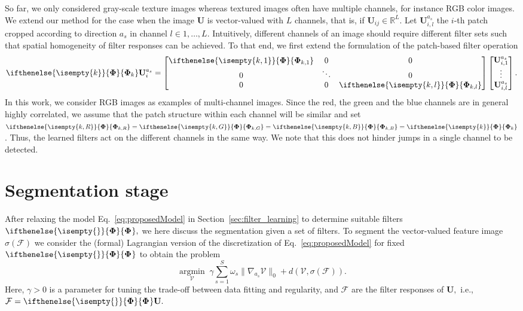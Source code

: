 \documentclass[journal]{IEEEtran}
\newcommand{\Matrix}[1]{\mathbf{#1}}
\newcommand{\Tensor}[1]{\mathcal{#1}}
\newcommand{\argmin}{\operatorname*{argmin}}
\newcommand{\AOF}[1]{\ifthenelse{\isempty{#1}}{\boldsymbol{\Phi}}{\boldsymbol{\Phi}_{#1}}}
\newcommand{\SCI}{\Matrix{U}}
\begin{document}
So far, we only considered gray-scale texture images whereas textured images often have multiple channels, for instance RGB color images.
We extend our method for the case when the image $\Matrix{U}$ is vector-valued with $L$ channels, that is, if $\Matrix{U}_{ij} \in \mathbb{R}^L.$
Let $\SCI_{i,l}^{a_s}$ the $i$-th patch cropped according to direction $a_s$ in channel $l \in 1,\dots,L$.
Intuitively, different channels of an image should require different filter sets such that spatial homogeneity of filter responses can be achieved.
To that end, we first extend the formulation of the patch-based filter operation
\begin{equation}
\AOF{k} \SCI_{i}^{a_s} = 
\begin{bmatrix}
    \AOF{k,1} & 0 & 0 \\
    0 & \ddots & 0 \\
    0 & 0 & \AOF{k,l}
\end{bmatrix}
\begin{bmatrix}
    \Matrix{U}_{i,1}^{a_s}\\
    \vdots\\
    \Matrix{U}_{i,l}^{a_s}
\end{bmatrix}.
\end{equation}
In this work, we consider RGB images as examples of multi-channel images. Since the red, the green and the blue channels are in general highly correlated, we assume that the patch structure within each channel will be similar and set $\AOF{k,R}=\AOF{k,G}=\AOF{k,B}=\AOF{k}$. Thus, the learned filters act on the different channels in the same way. We note that this does not hinder jumps in a single channel to be detected.


\section{Segmentation stage}\label{sec:SegmetationStage}
After relaxing the model Eq.~\eqref{eq:proposedModel} in Section~\ref{sec:filter_learning}
to determine suitable filters $\AOF{},$
we here discuss the segmentation given a set of filters.
To segment the vector-valued feature image $\sigma(\Tensor{F})$
we consider the (formal) Lagrangian version of 
the discretization of Eq.~\eqref{eq:proposedModel} for fixed $\AOF{}$ to obtain
the problem
\begin{equation}\label{eq:pottsLagrange}
\argmin_{\Tensor{V}} \; \gamma \sum_{ s=1}^S  \omega_s \| \nabla_{a_s}  \Tensor{V} \|_0 + d(\Tensor{V}, \sigma(\Tensor{F} )).
\end{equation}
Here, $\gamma > 0$ is a parameter for tuning the trade-off between 
data fitting and regularity, and $\Tensor{F}$ are the filter responses of $\Matrix{U},$
i.e., $\Tensor{F}  =  \AOF{}\Matrix{U}.$
\end{document}
